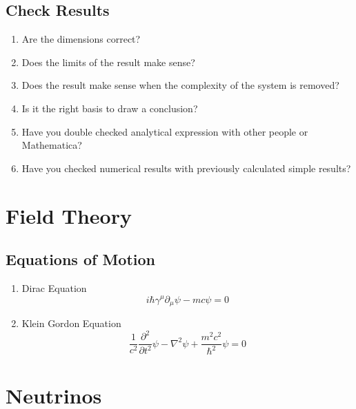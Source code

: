 \documentclass{sciposter}
\begin{document}
\begin{multicols}{3}
\subsection{Check Results}

\begin{enumerate}
    \item Are the dimensions correct?
    \item Does the limits of the result make sense?
    \item Does the result make sense when the complexity of the system is removed?
    \item Is it the right basis to draw a conclusion?
    \item Have you double checked analytical expression with other people or Mathematica?
    \item Have you checked numerical results with previously calculated simple results?
\end{enumerate}








\section{Field Theory}


\subsection{Equations of Motion}

\begin{enumerate}
\item Dirac Equation
\begin{equation}
i\hbar \gamma^\mu \partial_\mu \psi - m c \psi = 0
\end{equation}
\item Klein Gordon Equation
\begin{equation}
\frac {1}{c^2} \frac{\partial^2}{\partial t^2} \psi - \nabla^2 \psi + \frac {m^2 c^2}{\hbar^2} \psi = 0
\end{equation}
\end{enumerate}






\section{Neutrinos}



\end{multicols}
\end{document}

